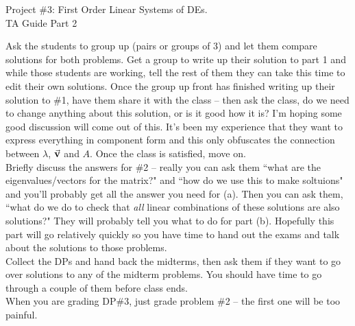 \documentclass[epsf]{article}
\begin{document}
\newcommand{\R}{\mathbb{R}}
\newcommand{\noi}{\noindent}
\newcommand{\bs}{\bigskip}




\begin{center}
{\Large Project \#3: First Order Linear Systems of DEs.\\
\vskip 2mm
TA Guide Part 2}
\end{center}

\noi{\bf 1} Ask the students to group up (pairs or groups of 3) and let them compare solutions for both problems.  Get a group to write up their solution to part 1 and while those students are working, tell the rest of them they can take this time to edit their own solutions.  Once the group up front has finished writing up their solution to \#1, have them share it with the class -- then ask the class, do we need to change anything about this solution, or is it good how it is?  I'm hoping some good discussion will come out of this.  It's been my experience that they want to express everything in component form and this only obfuscates the connection between $\lambda$, $\vec{\bf v}$ and $A$.  Once the class is satisfied, move on.\\

\noi{\bf 2.} Briefly discuss the answers for \#2 -- really you can ask them ``what are the eigenvalues/vectors for the matrix?" and ``how do we use this to make soltuions" and you'll probably get all the answer you need for (a).  Then you can ask them, ``what do we do to check that \textit{all} linear combinations of these solutions are also solutions?"  They will probably tell you what to do for part (b).  Hopefully this part will go relatively quickly so you have time to hand out the exams and talk about the solutions to those problems.\\

\noi{\bf 3.} Collect the DPs and hand back the midterms, then ask them if they want to go over solutions to any of the midterm problems.  You should have time to go through a couple of them before class ends.\\

\noi{\bf 4.} When you are grading DP\#3, just grade problem \#2 -- the first one will be too painful.\\
\end{document}
